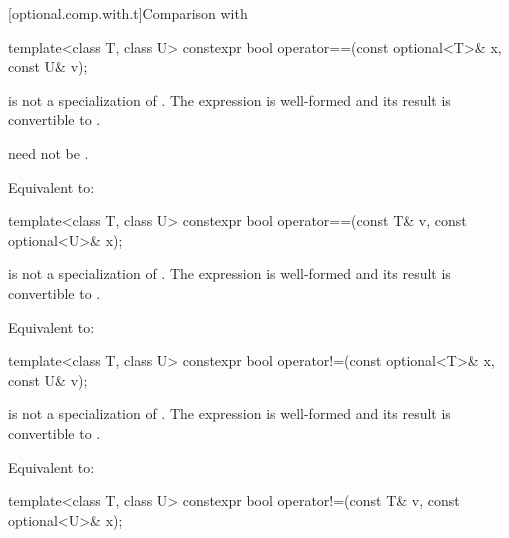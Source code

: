 [optional.comp.with.t]{Comparison with }

%
\begin{itemdecl}
template<class T, class U> constexpr bool operator==(const optional<T>& x, const U& v);
\end{itemdecl}

\begin{itemdescr}
\pnum
\constraints
{} is not a specialization of .
The expression  is well-formed and
its result is convertible to .
\begin{note}
 need not be .
\end{note}

\pnum
\effects
Equivalent to: 
\end{itemdescr}

%
\begin{itemdecl}
template<class T, class U> constexpr bool operator==(const T& v, const optional<U>& x);
\end{itemdecl}

\begin{itemdescr}
\pnum
\constraints
{} is not a specialization of .
The expression  is well-formed and
its result is convertible to .

\pnum
\effects
Equivalent to: 
\end{itemdescr}

%
\begin{itemdecl}
template<class T, class U> constexpr bool operator!=(const optional<T>& x, const U& v);
\end{itemdecl}

\begin{itemdescr}
\pnum
\constraints
{} is not a specialization of .
The expression  is well-formed and
its result is convertible to .

\pnum
\effects
Equivalent to: 
\end{itemdescr}

%
\begin{itemdecl}
template<class T, class U> constexpr bool operator!=(const T& v, const optional<U>& x);
\end{itemdecl}

